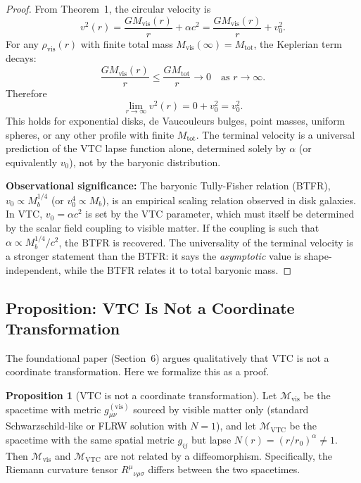 \documentclass[11pt,a4paper]{article}
\theoremstyle{definition}
\newtheorem{proposition}[theorem]{Proposition}
\newcommand{\vis}{\mathrm{vis}}
\newcommand{\VTC}{\mathrm{VTC}}
\newcommand{\Riem}{R^{\mu}{}_{\nu\rho\sigma}}
\begin{document}
\begin{proof}
From Theorem~1, the circular velocity is
\begin{equation}
v^2(r) = \frac{GM_{\vis}(r)}{r} + \alpha c^2 = \frac{GM_{\vis}(r)}{r} + v_0^2.
\end{equation}
For any $\rho_{\vis}(r)$ with finite total mass $M_{\vis}(\infty) = M_{\mathrm{tot}}$, the Keplerian term decays:
\begin{equation}
\frac{GM_{\vis}(r)}{r} \leq \frac{GM_{\mathrm{tot}}}{r} \to 0 \quad \text{as } r \to \infty.
\end{equation}
Therefore
\begin{equation}
\lim_{r\to\infty} v^2(r) = 0 + v_0^2 = v_0^2.
\end{equation}
This holds for exponential disks, de Vaucouleurs bulges, point masses, uniform spheres, or any other profile with finite $M_{\mathrm{tot}}$. The terminal velocity is a universal prediction of the VTC lapse function alone, determined solely by $\alpha$ (or equivalently $v_0$), not by the baryonic distribution.

\textbf{Observational significance:} The baryonic Tully-Fisher relation (BTFR), $v_0 \propto M_b^{1/4}$ (or $v_0^4 \propto M_b$), is an empirical scaling relation observed in disk galaxies. In VTC, $v_0 = \alpha c^2$ is set by the VTC parameter, which must itself be determined by the scalar field coupling to visible matter. If the coupling is such that $\alpha \propto M_b^{1/4}/c^2$, the BTFR is recovered. The universality of the terminal velocity is a stronger statement than the BTFR: it says the \textit{asymptotic} value is shape-independent, while the BTFR relates it to total baryonic mass.
\end{proof}

\subsection{Proposition: VTC Is Not a Coordinate Transformation}
\label{prop:not_coord}

The foundational paper (Section~6) argues qualitatively that VTC is not a coordinate transformation. Here we formalize this as a proof.

\begin{proposition}[VTC is not a coordinate transformation]
Let $\mathcal{M}_{\vis}$ be the spacetime with metric $g_{\mu\nu}^{(\vis)}$ sourced by visible matter only (standard Schwarzschild-like or FLRW solution with $N=1$), and let $\mathcal{M}_{\VTC}$ be the spacetime with the same spatial metric $g_{ij}$ but lapse $N(r) = (r/r_0)^\alpha \neq 1$. Then $\mathcal{M}_{\vis}$ and $\mathcal{M}_{\VTC}$ are not related by a diffeomorphism. Specifically, the Riemann curvature tensor $\Riem$ differs between the two spacetimes.
\end{proposition}
\end{document}
